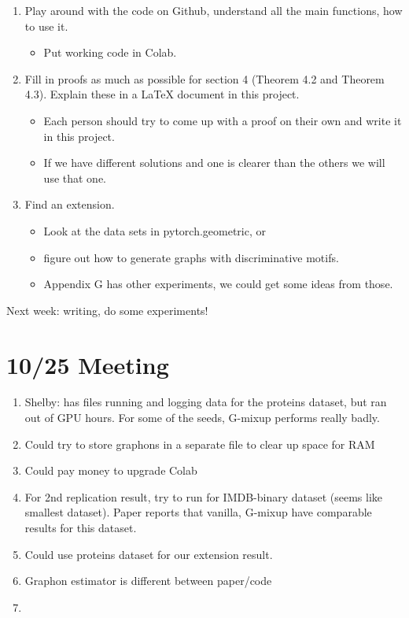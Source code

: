 \documentclass[12pt]{amsart}
\begin{document}
\begin{enumerate}
    \item Play around with the code on Github, understand all the main functions, how to use it.
    \begin{itemize}
        \item Put working code in Colab.
    \end{itemize}
    \item Fill in proofs as much as possible for section 4 (Theorem 4.2 and Theorem 4.3). Explain these in a LaTeX document in this project.
    \begin{itemize}
        \item Each person should try to come up with a proof on their own and write it in this project.
        \item If we have different solutions and one is clearer than the others we will use that one.
    \end{itemize}
    \item Find an extension.
    \begin{itemize}
        \item Look at the data sets in pytorch.geometric, or
        \item figure out how to generate graphs with discriminative motifs.
        \item Appendix G has other experiments, we could get some ideas from those.
    \end{itemize}
\end{enumerate}

Next week: writing, do some experiments!

\section{10/25 Meeting}
\begin{enumerate}
    \item Shelby: has files running and logging data for the proteins dataset, but ran out of GPU hours. For some of the seeds, G-mixup performs really badly.
    \item Could try to store graphons in a separate file to clear up space for RAM
    \item Could pay money to upgrade Colab
    \item For 2nd replication result, try to run for IMDB-binary dataset (seems like smallest dataset). Paper reports that vanilla, G-mixup have comparable results for this dataset. 
    \item Could use proteins dataset for our extension result.
    \item Graphon estimator is different between paper/code
    \item 
    \end{enumerate}
    
\end{document}
